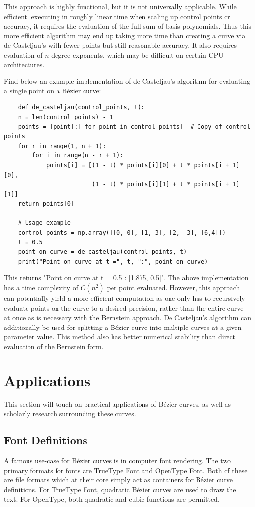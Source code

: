 \documentclass{article}
\begin{document}
This approach is highly functional, but it is not universally applicable. While efficient, executing in roughly linear time when scaling up control points or accuracy, it requires the evaluation of the full sum of basis polynomials. Thus this more efficient algorithm may end up taking more time than creating a curve via de Casteljau's with fewer points but still reasonable accuracy. It also requires evaluation of $n$ degree exponents, which may be difficult on certain CPU architectures. 

Find below an example implementation of de Casteljau's algorithm for evaluating a single point on a Bézier curve:
\begin{verbatim}
    def de_casteljau(control_points, t):
    n = len(control_points) - 1
    points = [point[:] for point in control_points]  # Copy of control points
    for r in range(1, n + 1):
        for i in range(n - r + 1):
            points[i] = [(1 - t) * points[i][0] + t * points[i + 1][0],
                         (1 - t) * points[i][1] + t * points[i + 1][1]]
    return points[0]

    # Usage example
    control_points = np.array([[0, 0], [1, 3], [2, -3], [6,4]])
    t = 0.5
    point_on_curve = de_casteljau(control_points, t)
    print("Point on curve at t =", t, ":", point_on_curve)
\end{verbatim}

 This returns "Point on curve at t = 0.5 : [1.875, 0.5]". The above implementation has a time complexity of $O(n^2)$ per point evaluated. However, this approach can potentially yield a more efficient computation as one only has to recursively evaluate points on the curve to a desired precision, rather than the entire curve at once as is necessary with the Bernstein approach. De Casteljau's algorithm can additionally be used for splitting a Bézier curve into multiple curves at a given parameter value. This method also has better numerical stability than direct evaluation of the Bernstein form.

\pagebreak

\section{Applications}
This section will touch on practical applications of Bézier curves, as well as scholarly research surrounding these curves.

\subsection{Font Definitions}
A famous use-case for Bézier curves is in computer font rendering. The two primary formats for fonts are TrueType Font and OpenType Font. Both of these are file formats which at their core simply act as containers for Bézier curve definitions. For TrueType Font, quadratic Bézier curves are used to draw the text. For OpenType, both quadratic and cubic functions are permitted.\cite{berlasso17}
\end{document}
